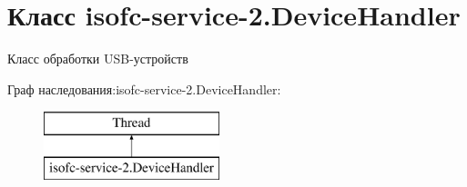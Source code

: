 \hypertarget{classisofc-service-2_1_1DeviceHandler}{}\section{Класс isofc-\/service-\/2.Device\+Handler}
\label{classisofc-service-2_1_1DeviceHandler}


Класс обработки U\+S\+B-\/устройств  


Граф наследования\+:isofc-\/service-\/2.Device\+Handler\+:\begin{figure}[H]
\begin{center}
\leavevmode
\includegraphics[height=2.000000cm]{classisofc-service-2_1_1DeviceHandler}
\end{center}
\end{figure}
